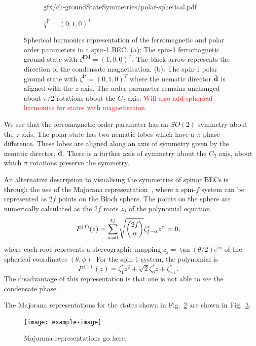\begin{figure}
\begin{subfigure}{0.49\textwidth}
        {gfx/ch-groundStateSymmetries/polar-spherical.pdf}
        \caption{\label{subfig: spin-1-polar-spherical}
        \(\zeta^\mathrm{P}={(0, 1, 0)}^T\)}
    \end{subfigure}
    \caption{\label{fig: spin-1-spherical-harmonics}
    Spherical harmonics representation of the ferromagnetic and polar order
    parameters in a spin-1 BEC.\@
    (a): The spin-1 ferromagnetic ground state with
    \(\zeta^\mathrm{FM}={(1, 0, 0)}^T\).
    The black arrow represents the direction of the condensate magnetisation.
    (b): The spin-1 polar ground state with
    \(\zeta^\mathrm{P}={(0, 1, 0)}^T\) where the nematic director
    \(\hat{\vb{d}}\) is aligned with the \(z\)-axis.
    The order parameter remains unchanged about \(\pi/2\) rotations about the
    \(C_2\) axis.
    \textcolor{red}{Will also add spherical harmonics for states with
        magnetisation.}}
\end{figure}

We see that the ferromagnetic order parameter has an \(SO(2)\) symmetry about
the \(z\)-axis.
The polar state has two nematic lobes which have a \(\pi \) phase difference.
These lobes are aligned along an axis of symmetry given by the nematic director,
\(\hat{\vb{d}}\).
There is a further axis of symmetry about the \(C_2\) axis, about which \(\pi \)
rotations preserve the symmetry.

An alternative description to visualising the symmetries of spinor BECs is
through the use of the Majorana representation~\cite{Majorana1932,Bloch1945},
where a spin-\(f\) system can be represented as \(2f\) points on the Bloch
sphere.
The points on the sphere are numerically calculated as the \(2f\) roots
\(z_j\) of the polynomial equation
\begin{equation}
    P^{(f)}(z) = \sum_{\alpha = 0}^{2f}
    \sqrt{\mqty(2f \\ \alpha)}\zeta_{f-\alpha}^*z^\alpha=0,
\end{equation}
where each root represents a stereographic mapping
\(z_j=\tan(\theta/2)e^{i\phi}\) of the spherical coordinates \((\theta, \phi)\).
For the spin-1 system, the polynomial is
\begin{equation}
    P^{(1)}(z) = \zeta_1^*z^2+\sqrt{2}\zeta_0^*z+\zeta_{-1}^*.
\end{equation}
The disadvantage of this representation is that one is not able to see the
condensate phase.

The Majorana representations for the states shown in
Fig.~\ref{fig: spin-1-spherical-harmonics} are shown in
Fig.~\ref{fig: spin-1-majorana}.
\begin{figure}
    \centering
    \texttt{[image: example-image]}
    \caption{\label{fig: spin-1-majorana}Majorana representations go here.}
\end{figure}


